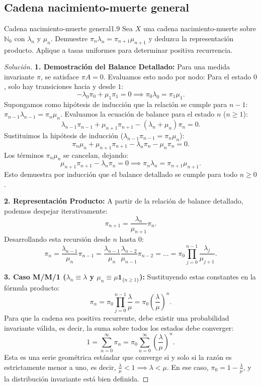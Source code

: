 \documentclass[10pt,a4paper]{article}
\begin{document}
\newpage
\subsection{Cadena nacimiento-muerte general}

\begin{ejercicio}{Cadena nacimiento-muerte general}{1.9}
    Sea $X$ una cadena nacimiento-muerte sobre $\mathbb{N}_0$ con $\lambda_n$ y $\mu_n$. 
    Demuestre $\pi_n \lambda_n = \pi_{n+1}\mu_{n+1}$ y deduzca
    la representación producto. Aplique a tasas uniformes para determinar positiva recurrencia.
\end{ejercicio}

\begin{proof}[Solución]
    \textbf{1. Demostración del Balance Detallado:}
    Para una medida invariante $\pi$, se satisface $\pi A = 0$. Evaluamos esto nodo por nodo:
    Para el estado $0$, solo hay transiciones hacia y desde $1$:
    \[ -\lambda_0 \pi_0 + \mu_1 \pi_1 = 0 \implies \pi_0 \lambda_0 = \pi_1 \mu_1. \]
    Supongamos como hipótesis de inducción que la relación se cumple para $n-1$: $\pi_{n-1}\lambda_{n-1} = \pi_n \mu_n$.
    Evaluamos la ecuación de balance para el estado $n$ ($n \ge 1$):
    \[ \lambda_{n-1}\pi_{n-1} + \mu_{n+1}\pi_{n+1} - (\lambda_n + \mu_n)\pi_n = 0. \]
    Sustituimos la hipótesis de inducción ($\lambda_{n-1}\pi_{n-1} = \pi_n \mu_n$):
    \[ \pi_n \mu_n + \mu_{n+1}\pi_{n+1} - \lambda_n \pi_n - \mu_n \pi_n = 0. \]
    Los términos $\pi_n \mu_n$ se cancelan, dejando:
    \[ \mu_{n+1}\pi_{n+1} - \lambda_n \pi_n = 0 \implies \pi_n \lambda_n = \pi_{n+1}\mu_{n+1}. \]
    Esto demuestra por inducción que el balance detallado se cumple para todo $n \ge 0$.

    \textbf{2. Representación Producto:}
    A partir de la relación de balance detallado, podemos despejar iterativamente:
    \[ \pi_{n+1} = \frac{\lambda_n}{\mu_{n+1}} \pi_n. \]
    Desarrollando esta recursión desde $n$ hasta $0$:
    \[ \pi_n = \frac{\lambda_{n-1}}{\mu_n} \pi_{n-1} = \frac{\lambda_{n-1}}{\mu_n} \frac{\lambda_{n-2}}{\mu_{n-1}} \pi_{n-2} = \dots = \pi_0 \prod_{j=0}^{n-1} \frac{\lambda_j}{\mu_{j+1}}. \]
    
    \textbf{3. Caso M/M/1 ($\lambda_n \equiv \lambda$ y $\mu_n \equiv \mu \mathbf{1}_{\{n\ge 1\}}$):}
    Sustituyendo estas constantes en la fórmula producto:
    \[ \pi_n = \pi_0 \prod_{j=0}^{n-1} \frac{\lambda}{\mu} = \pi_0 \left(\frac{\lambda}{\mu}\right)^n. \]
    Para que la cadena sea positiva recurrente, debe existir una probabilidad invariante válida, es decir, la suma sobre todos los estados debe converger:
    \[ 1 = \sum_{n=0}^\infty \pi_n = \pi_0 \sum_{n=0}^\infty \left(\frac{\lambda}{\mu}\right)^n. \]
    Esta es una serie geométrica estándar que converge si y solo si la razón es estrictamente menor a uno, es decir, $\frac{\lambda}{\mu} < 1 \implies \lambda < \mu$.
    En ese caso, $\pi_0 = 1 - \frac{\lambda}{\mu}$, y la distribución invariante está bien definida.
\end{proof}
\end{document}
